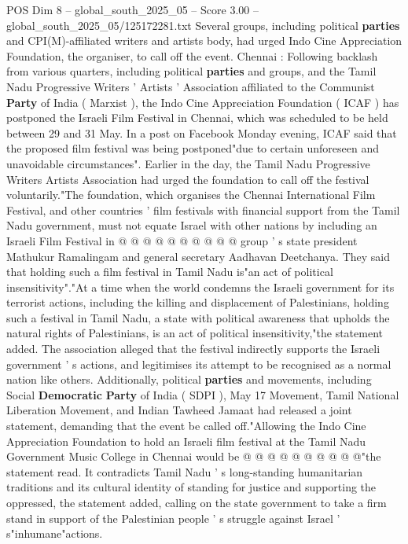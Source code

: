 \begin{textsample}{POS Dim 8 – global\_south\_2025\_05 – Score 3.00 – global\_south\_2025\_05/125172281.txt}  \label{ex:f8_pos_445}
Several groups, including political \textbf{parties} and CPI(M)-affiliated writers and artists body, had urged Indo Cine Appreciation Foundation, the organiser, to call off the event.
Chennai : Following backlash from various quarters, including political \textbf{parties} and groups, and the Tamil Nadu Progressive Writers ' Artists ' Association affiliated to the Communist \textbf{Party} of India ( Marxist ), the Indo Cine Appreciation Foundation ( ICAF ) has postponed the Israeli Film Festival in Chennai, which was scheduled to be held between 29 and 31 May.
In a post on Facebook Monday evening, ICAF said that the proposed film festival was being postponed"due to certain unforeseen and unavoidable circumstances".
Earlier in the day, the Tamil Nadu Progressive Writers Artists Association had urged the foundation to call off the festival voluntarily."The foundation, which organises the Chennai International Film Festival, and other countries ' film festivals with financial support from the Tamil Nadu government, must not equate Israel with other nations by including an Israeli Film Festival in @ @ @ @ @ @ @ @ @ @ group ' s state president Mathukur Ramalingam and general secretary Aadhavan Deetchanya.
They said that holding such a film festival in Tamil Nadu is"an act of political insensitivity"."At a time when the world condemns the Israeli government for its terrorist actions, including the killing and displacement of Palestinians, holding such a festival in Tamil Nadu, a state with political awareness that upholds the natural rights of Palestinians, is an act of political insensitivity,"the statement added.
The association alleged that the festival indirectly supports the Israeli government ' s actions, and legitimises its attempt to be recognised as a normal nation like others.
Additionally, political \textbf{parties} and movements, including Social \textbf{Democratic} \textbf{Party} of India ( SDPI ), May 17 Movement, Tamil National Liberation Movement, and Indian Tawheed Jamaat had released a joint statement, demanding that the event be called off."Allowing the Indo Cine Appreciation Foundation to hold an Israeli film festival at the Tamil Nadu Government Music College in Chennai would be @ @ @ @ @ @ @ @ @ @"the statement read.
It contradicts Tamil Nadu ' s long-standing humanitarian traditions and its cultural identity of standing for justice and supporting the oppressed, the statement added, calling on the state government to take a firm stand in support of the Palestinian people ' s struggle against Israel ' s"inhumane"actions.

\end{textsample}

